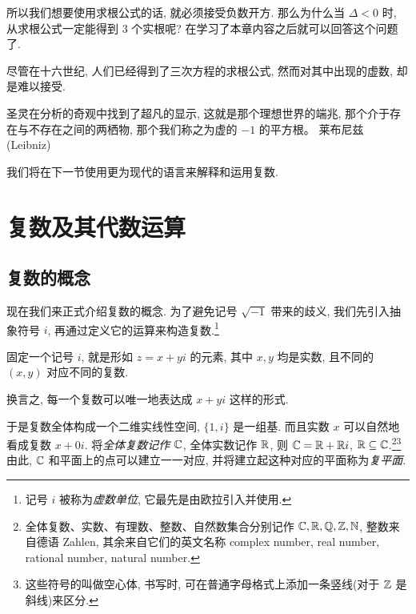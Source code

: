 所以我们想要使用求根公式的话, 就\alert{必须接受负数开方}.
那么为什么当 $\Delta<0$ 时, 从求根公式一定能得到 $3$ 个实根呢?
在学习了本章内容之后就可以回答这个问题了.

尽管在十六世纪, 人们已经得到了三次方程的求根公式, 然而对其中出现的虚数, 却是难以接受.

\begin{tcolorbox}[
  common,
  borderline={0pt}{0pt}{fourth,cstdash},
  colbacktitle=fourth,
  fontlower=\itshape,
  halign lower=flush right,
  lower separated=true]
	圣灵在分析的奇观中找到了超凡的显示, 这就是那个理想世界的端兆, 那个介于存在与不存在之间的两栖物, 那个我们称之为虚的 $-1$ 的平方根。
  \tcblower
  莱布尼兹 (Leibniz)
\end{tcolorbox}

我们将在下一节使用更为现代的语言来解释和运用复数.


\section{复数及其代数运算}

\subsection{复数的概念}

现在我们来正式介绍复数的概念.
为了避免记号 $\sqrt{-1}$ 带来的歧义, 我们先引入抽象符号 $i$, 再通过定义它的运算来构造复数.\footnote{记号 $i$ 被称为\emph{虚数单位}, 它最先是由欧拉引入并使用.}

\begin{definition}[复数]
  固定一个记号 $i$, 就是形如 $z=x+yi$ 的元素, 其中 $x,y$ 均是实数, 且不同的 $(x,y)$ 对应不同的复数.
\end{definition}

换言之, 每一个复数可以唯一地表达成 $x+yi$ 这样的形式.

于是复数全体构成一个二维实线性空间, $\{1,i\}$ 是一组基. 而且实数 $x$ 可以自然地看成复数 $x+0i$.
将\emph{全体复数记作 ${\mathbb{C}}$}, 全体实数记作 ${\mathbb{R}}$, 则 ${\mathbb{C}}={\mathbb{R}}+{\mathbb{R}} i$, ${\mathbb{R}}\subseteq {\mathbb{C}}$.\footnote{
  全体复数、实数、有理数、整数、自然数集合分别记作 ${\mathbb{C}},{\mathbb{R}},{\mathbb{Q}},{\mathbb{Z}},{\mathbb{N}}$, 整数来自德语 Zahlen, 其余来自它们的英文名称 complex number, real number, rational number, natural number.
}\footnote{
  这些符号的叫做空心体, 书写时, 可在普通字母格式上添加一条竖线(对于 ${\mathbb{Z}}$ 是斜线)来区分.
}
由此, ${\mathbb{C}}$ 和平面上的点可以建立一一对应, 并将建立起这种对应的平面称为\emph{复平面}.

